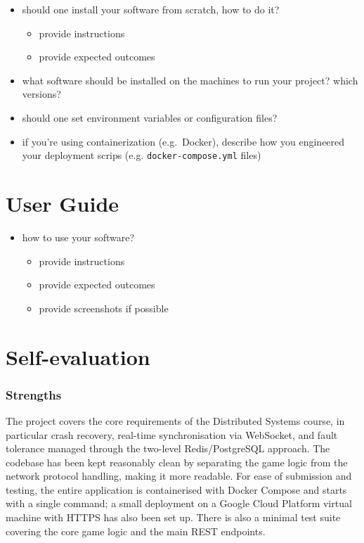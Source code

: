 \documentclass{scrartcl}
\begin{document}
\begin{itemize}
  \item should one install your software from scratch, how to do it?
  \begin{itemize}
    \item provide instructions
    \item provide expected outcomes
  \end{itemize}

  \item what software should be installed on the machines to run your project? which versions?
  
  \item should one set environment variables or configuration files?
  
  \item if you're using containerization (e.g.~Docker), 
  describe how you engineered your deployment scrips (e.g. \texttt{docker-compose.yml} files)
\end{itemize}

\section{User Guide}\label{user-guide}

\begin{itemize}
  \item how to use your software?
  \begin{itemize}
    \item provide instructions
    \item provide expected outcomes
    \item provide screenshots if possible
  \end{itemize}
\end{itemize}

\section{Self-evaluation}\label{self-evaluation}

\subsubsection*{Strengths}

The project covers the core requirements of the Distributed Systems course,
in particular crash recovery, real-time synchronisation via WebSocket,
and fault tolerance managed through the two-level Redis/PostgreSQL approach.
The codebase has been kept reasonably clean by separating the game logic
from the network protocol handling, making it more readable.
For ease of submission and testing, the entire application is containerised
with Docker Compose and starts with a single command; a small deployment
on a Google Cloud Platform virtual machine with HTTPS has also been set up.
There is also a minimal test suite covering the core game logic
and the main REST endpoints.
\end{document}
